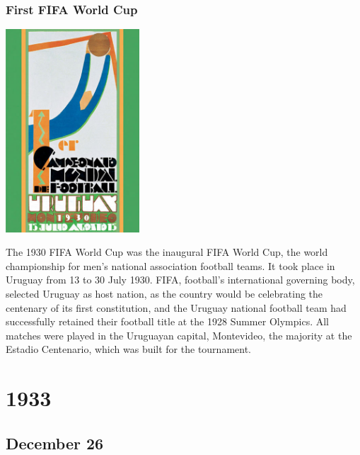 \documentclass[11pt]{report}
\begin{document}
\subsection{First FIFA World Cup}
\vspace{2mm}\begin{center}\includegraphics[width=5cm]{./img/fifa1930.jpg}\end{center}
The 1930 FIFA World Cup was the inaugural FIFA World Cup, the world championship for men's national association football teams. It took place in Uruguay from 13 to 30 July 1930. FIFA, football's international governing body, selected Uruguay as host nation, as the country would be celebrating the centenary of its first constitution, and the Uruguay national football team had successfully retained their football title at the 1928 Summer Olympics. All matches were played in the Uruguayan capital, Montevideo, the majority at the Estadio Centenario, which was built for the tournament.

\chapter{1933}
\section{December 26}
\end{document}
